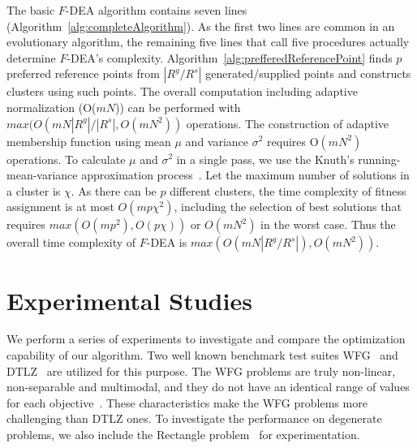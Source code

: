 \documentclass[review]{elsarticle}
\begin{document}
The basic $F$-DEA algorithm contains seven lines (Algorithm~\ref{alg:completeAlgorithm}). As the first two lines are common in an evolutionary algorithm, the remaining five lines that call five procedures
 actually determine $F$-DEA's complexity.
Algorithm~\ref{alg:prefferedReferencePoint} finds  $p$ preferred reference points from $\left|R^g/R^s\right|$ generated/supplied points and constructs clusters using such points. The overall computation including adaptive normalization (O($mN$)) can be performed with $max(O(mN\left|R^g\right|/\left|R^s\right|,O(mN^2))$ operations.  
The construction of adaptive membership function using mean $\mu$ and  variance $\sigma^2$ requires O$(mN^2)$ operations.%
To calculate $\mu$ and $\sigma^2$ in a single pass, we use the Knuth's running-mean-variance approximation process~\citep{Knuth:1997:ACP:270146}. 
Let the maximum number of solutions in a cluster is $\chi$. As there can be  $p$ different clusters, the time complexity of fitness assignment is at most $O(mp\chi^2)$, including the selection of best solutions
  that requires  $max(O(mp^2),O(p\chi))$ or $O(mN^2)$ in the worst case.
Thus the overall time complexity of $F$-DEA is  $max(O(mN \left|R^g/R^s\right|),O(mN^2))$.

\section{Experimental Studies}
\label{sec:expstudies}

We perform a series of experiments to investigate and compare the optimization capability of our algorithm. Two well known benchmark test suites   WFG~\citep{huband2006review} and 
DTLZ~\citep{deb2005scalable} are utilized for this purpose. The WFG problems are  truly non-linear, non-separable and  multimodal, and they do not have an identical range of values for each objective~\citep{huband2006review}. These characteristics make the WFG problems more challenging than DTLZ ones. To investigate the performance on degenerate problems,
we also include the Rectangle problem~\citep{rectangleproblem} for experimentation.
\end{document}
